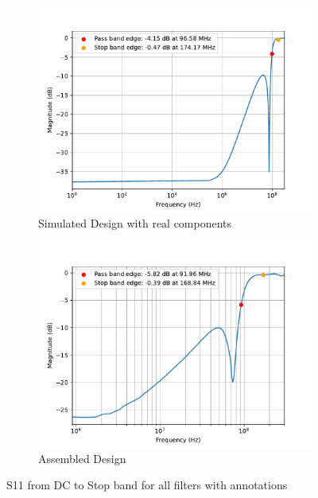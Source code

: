 \documentclass[letterpaper,12pt]{article}
\begin{document}
\begin{figure}[H]
    \medskip
  
    \begin{subfigure}[t]{.49\textwidth}
      \centering
      \includegraphics[width=\linewidth]{figures/7.real}
      \caption{Simulated Design with real components}
    \end{subfigure}
    \hfill
    \begin{subfigure}[t]{.49\textwidth}
      \centering
      \includegraphics[width=\linewidth]{figures/7.assembled}
      \caption{Assembled Design}
    \end{subfigure}
    \vspace{0.5cm}
    \caption{S11 from DC to Stop band for all filters with annotations}
  \end{figure}
\end{document}
